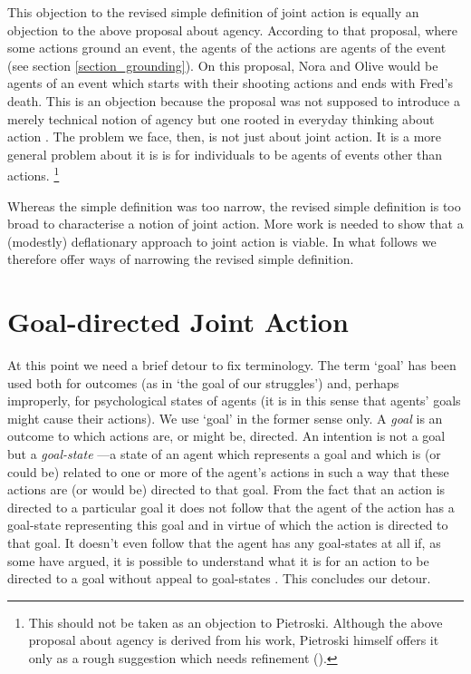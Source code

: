 \documentclass[12pt,a4paper]{extarticle}
\begin{document}
This objection to the revised simple definition of joint action is equally an objection to the above proposal about agency.
According to that proposal, where some actions ground an event, the agents of the actions are agents of the event (see section \ref{section_grounding}).
On this proposal, Nora and Olive would be agents of an event which starts with their shooting actions  and ends with Fred's death.
This is an objection because the proposal was not supposed to introduce a merely technical notion of agency but one rooted in everyday thinking about action \citep[pp.\ 80-1]{pietroski_actions_1998}.
The problem we face, then, is not just about joint action.
It is a more general problem about it is is for individuals to be agents of events other than actions.%
%
\footnote{
This should not be taken as an objection to Pietroski.
Although the above proposal about agency is derived from his work, Pietroski himself offers it only as a rough suggestion which needs refinement 
(\citeyear[p.\ 82, footnote 6]{pietroski_actions_1998}).
}

Whereas the simple definition was too narrow,
the revised simple definition is too broad to characterise a notion of joint action.
More work is needed to show that a (modestly) deflationary approach to joint action is viable.
In what follows we therefore offer ways of narrowing the revised simple definition.

\label{end_section_second_objection}


\section{Goal-directed Joint Action}
	\label{section_goal_directed_joint_action}

At this point we need a brief detour to fix terminology.
The term `goal' has been used both for outcomes (as in `the goal of our struggles') and, perhaps improperly, for psychological states of agents (it is in this sense that agents' goals might cause their actions).  
We use `goal' in the former sense only.
A \emph{goal} 
	\label{df_goal}
is an outcome to which actions are, or might be, directed.
An intention is not a goal but a \emph{goal-state}%
	\label{df_goal_state}%
---a state of an agent 
	which represents a goal
	and
	which is (or could be) related to one or more of the agent's actions in such a way that these actions are (or would be) directed to that goal.
From the fact that an action is directed to a particular goal it does not follow that the agent of the action has a goal-state representing this goal and in virtue of which the action is directed to that goal.
It doesn't even follow that the agent has any goal-states at all if, as some have argued, it is possible to understand what it is for an action to be directed to a goal without appeal to goal-states \citep[e.g.][]{Bennett:1976rg,Taylor:1964tr}.
This concludes our detour.
\end{document}
